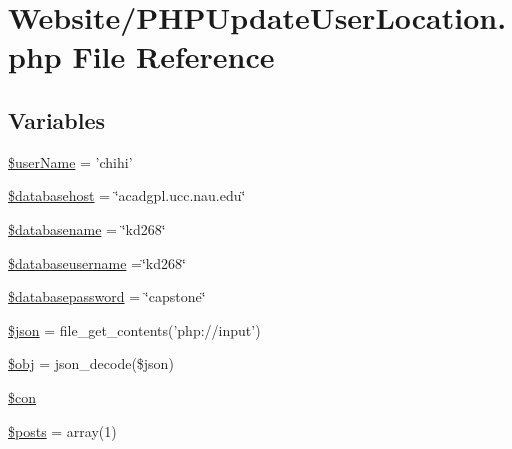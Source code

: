 \hypertarget{_p_h_p_update_user_location_8php}{\section{Website/\-P\-H\-P\-Update\-User\-Location.php File Reference}
\label{_p_h_p_update_user_location_8php}
}
\subsection*{Variables}
\begin{DoxyCompactItemize}
\item 
\hyperlink{_p_h_p_update_user_location_8php_aff20833df389a26c0f9384512eec4a68}{\$user\-Name} = 'chihi'
\item 
\hyperlink{_p_h_p_update_user_location_8php_a034ead57b6864a4413371711e8d65372}{\$databasehost} = \char`\"{}acadgpl.\-ucc.\-nau.\-edu\char`\"{}
\item 
\hyperlink{_p_h_p_update_user_location_8php_aace53f8afce81b52040cef0cd850138a}{\$databasename} = \char`\"{}kd268\char`\"{}
\item 
\hyperlink{_p_h_p_update_user_location_8php_a251bf75f510d7c8b556c65d7c30e911f}{\$databaseusername} =\char`\"{}kd268\char`\"{}
\item 
\hyperlink{_p_h_p_update_user_location_8php_a1a07536b6a5f43f2d8f826bd2ee6c91a}{\$databasepassword} = \char`\"{}capstone\char`\"{}
\item 
\hyperlink{_p_h_p_update_user_location_8php_acedd13b51401130848ce18f4d5c52605}{\$json} = file\-\_\-get\-\_\-contents('php\-://input')
\item 
\hyperlink{_p_h_p_update_user_location_8php_a9008ed94ba185855b1723e367744b87e}{\$obj} = json\-\_\-decode(\$json)
\item 
\hyperlink{_p_h_p_update_user_location_8php_a0debe10448ec56a57b5509648408a549}{\$con}
\item 
\hyperlink{_p_h_p_update_user_location_8php_a9f4cad5a721e7f7711fba0bf0f7ec273}{\$posts} = array(1)
\end{DoxyCompactItemize}


